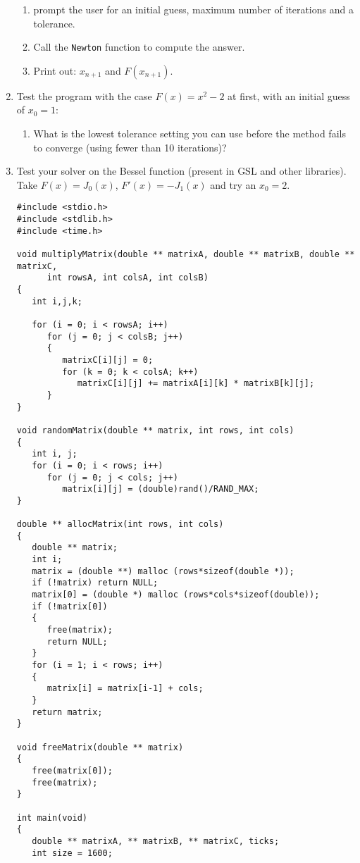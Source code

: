 \documentclass[a4paper,12pt]{article}
\begin{document}
\begin{enumerate}
\begin{enumerate}
\item prompt the user for an initial guess, maximum number of iterations and a tolerance.
\item Call the {\tt Newton} function to compute the answer.
\item Print out: $x_{n+1}$ and $F(x_{n+1})$.
\end{enumerate}
\item Test the program with the case $F(x) = x^2-2$ at first, with an initial guess of $x_0=1$:
\begin{enumerate}
\item What is the lowest tolerance setting you can use before the method fails to converge (using fewer than 10 iterations)?
\end{enumerate}
\item Test your solver on the Bessel function (present in GSL and other libraries).\\
Take $F(x) = J_0(x)$, $F'(x) = -J_1(x)$ and try an $x_0 = 2$.
\newpage
\begin{small}
\begin{verbatim}
#include <stdio.h>
#include <stdlib.h>
#include <time.h>

void multiplyMatrix(double ** matrixA, double ** matrixB, double ** matrixC,
      int rowsA, int colsA, int colsB)
{
   int i,j,k;

   for (i = 0; i < rowsA; i++)
      for (j = 0; j < colsB; j++)
      {
         matrixC[i][j] = 0;
         for (k = 0; k < colsA; k++)
            matrixC[i][j] += matrixA[i][k] * matrixB[k][j];
      }
}

void randomMatrix(double ** matrix, int rows, int cols)
{
   int i, j;
   for (i = 0; i < rows; i++)
      for (j = 0; j < cols; j++)
         matrix[i][j] = (double)rand()/RAND_MAX;
}

double ** allocMatrix(int rows, int cols)
{
   double ** matrix;
   int i;
   matrix = (double **) malloc (rows*sizeof(double *));
   if (!matrix) return NULL;
   matrix[0] = (double *) malloc (rows*cols*sizeof(double));
   if (!matrix[0])
   {
      free(matrix);
      return NULL;
   }
   for (i = 1; i < rows; i++)
   {
      matrix[i] = matrix[i-1] + cols;
   }
   return matrix;
}

void freeMatrix(double ** matrix)
{
   free(matrix[0]);
   free(matrix);
}

int main(void)
{
   double ** matrixA, ** matrixB, ** matrixC, ticks;
   int size = 1600;


\end{verbatim}
\end{small}
\end{enumerate}
\end{document}
